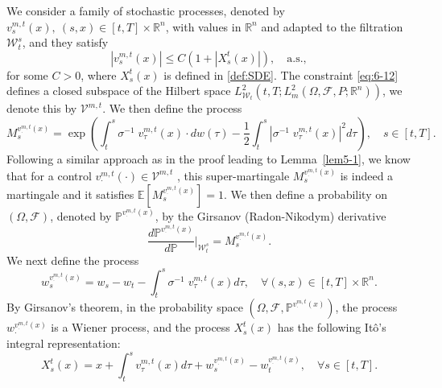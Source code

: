\documentclass[11pt]{article}
\numberwithin{equation}{section}
\newcommand{\e}{\mathbb{E}}
\newcommand{\brn}{{\mathbb{R}^n}}
\newcommand{\1}{\mbox{1\hspace{-1mm}I}}
\begin{document}
We consider a family of stochastic processes, denoted by  $v^{m,t}_s(x),\ (s,x)\in[t,T]\times\brn$, with values in $\brn$ and adapted to the filtration $\mathcal{W}_{t}^{s}$, and they satisfy 
\begin{equation}\label{eq:6-12}
    \left|v^{m,t}_s(x)\right|\le C\left(1+\left|X^{t}_s(x)\right|\right),\quad \text{a.s.},
\end{equation}
for some $C>0$, where $X^{t}_s(x)$ is defined in \eqref{def:SDE}. The constraint \eqref{eq:6-12} defines a closed subspace of the Hilbert space $L_{\mathcal{W}_{t}}^{2}\left(t,T;L_{m}^{2}(\Omega,\mathcal{F},P;\brn)\right)$, we denote this by $\mathcal{V}^{m,t}$. We then define the process 
\begin{equation}\label{eq:6-13}
    M^{v^{m,t}_\cdot(x)}_s=\exp\left(\int_{t}^{s}\sigma^{-1}\; v^{m,t}_\tau(x)\cdot dw(\tau)-\dfrac{1}{2}\int_{t}^{s}\left|\sigma^{-1}\; v^{m,t}_\tau(x)\right|^{2}d\tau\right),\quad s\in[t,T].
\end{equation}
Following a similar approach as in the proof leading to Lemma~\ref{lem5-1}, we know that for a control $v^{m,t}_\cdot(\cdot)\in \mathcal{V}^{m,t}$ , this super-martingale $M^{v^{m,t}_\cdot(x)}_s$ is indeed a martingale and it satisfies $\e \left[M^{v^{m,t}_\cdot(x)}_s\right]=1$.
We then define a probability on $(\Omega,\mathcal{F})$, denoted by $\mathbb{P}^{v^{m,t}_\cdot(x)}$, by the Girsanov (Radon-Nikodym) derivative 
\begin{equation*}\label{eq:6-16}
    \dfrac{d\mathbb{P}^{v^{m,t}_\cdot(x)}}{d\mathbb{P}}\bigg|_{\mathcal{W}_{t}^{s}}=M^{v^{m,t}_\cdot(x)}_s .
\end{equation*}
We next define the process 
\begin{equation*}\label{eq:6-17}
    w^{v^{m,t}_\cdot(x)}_s=w_s-w_t-\int_{t}^{s}\sigma^{-1}\;v^{m,t}_\tau(x)d\tau,\quad \forall (s,x)\in[t,T]\times\brn.
\end{equation*}
By Girsanov's theorem, in the probability space $\left(\Omega,\mathcal{F},\mathbb{P}^{v^{m,t}_\cdot(x)}\right)$, the process $w^{v^{m,t}_\cdot(x)}_\cdot$ is a Wiener process, and the process $X^{t}_s(x)$ has the following It\^o's integral representation:
\begin{equation*}\label{eq:6-18}
    X^{t}_s(x)=x+\int_t^s v^{m,t}_\tau(x)d\tau+w^{v^{m,t}_\cdot(x)}_s-w^{v^{m,t}_\cdot(x)}_t,\quad \forall s\in[t,T].
\end{equation*}
\end{document}
